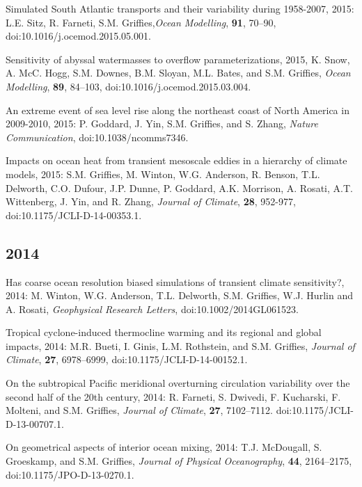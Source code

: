 \begin{etaremune}
\item Simulated South Atlantic transports and their variability during 1958-2007, 2015: L.E.  Sitz, R. Farneti, S.M. Grif\/f\/ies,{\it Ocean Modelling}, {\bf 91}, 70--90, doi:10.1016/j.ocemod.2015.05.001.

\item Sensitivity of abyssal watermasses to overflow parameterizations, 2015, K. Snow, A. McC. Hogg, S.M. Downes,  B.M. Sloyan, M.L. Bates, and S.M. Grif\/f\/ies, {\it Ocean Modelling}, {\bf 89}, 84--103, doi:10.1016/j.ocemod.2015.03.004.

\item An extreme event of sea level rise along the northeast coast of North America in 2009-2010, 2015: P.  Goddard, J. Yin, S.M. Grif\/f\/ies, and S. Zhang, {\it Nature Communication}, doi:10.1038/ncomms7346.

\item Impacts on ocean heat from transient mesoscale eddies in a hierarchy of climate models, 2015: S.M. Grif\/f\/ies, M. Winton, W.G. Anderson, R. Benson, T.L. Delworth, C.O. Dufour, J.P. Dunne, P. Goddard, A.K. Morrison, A. Rosati, A.T. Wittenberg, J. Yin, and R. Zhang, {\it Journal of Climate}, {\bf 28}, 952-977, doi:10.1175/JCLI-D-14-00353.1.

\subsection*{\sc \color{Maroon} 2014}


\item Has coarse ocean resolution biased simulations of transient climate sensitivity?, 2014: M.  Winton, W.G. Anderson, T.L. Delworth, S.M. Grif\/f\/ies, W.J. Hurlin and A. Rosati, {\it Geophysical Research Letters}, doi:10.1002/2014GL061523.

\item Tropical cyclone-induced thermocline warming and its regional and global impacts, 2014: M.R. Bueti, I. Ginis, L.M. Rothstein, and S.M. Grif\/f\/ies, {\it Journal of Climate}, {\bf 27},
  6978--6999, doi:10.1175/JCLI-D-14-00152.1.

\item On the subtropical Pacific meridional overturning circulation variability over the second half of the 20th century, 2014:  R. Farneti, S. Dwivedi, F. Kucharski, F. Molteni, and S.M. Grif\/f\/ies, {\it Journal of Climate}, {\bf 27}, 7102--7112.  doi:10.1175/JCLI-D-13-00707.1.

\item On geometrical aspects of interior ocean mixing, 2014:  T.J. McDougall, S. Groeskamp, and S.M. Grif\/f\/ies, {\it Journal of Physical Oceanography}, {\bf 44}, 2164--2175, doi:10.1175/JPO-D-13-0270.1.


\end{etaremune}
